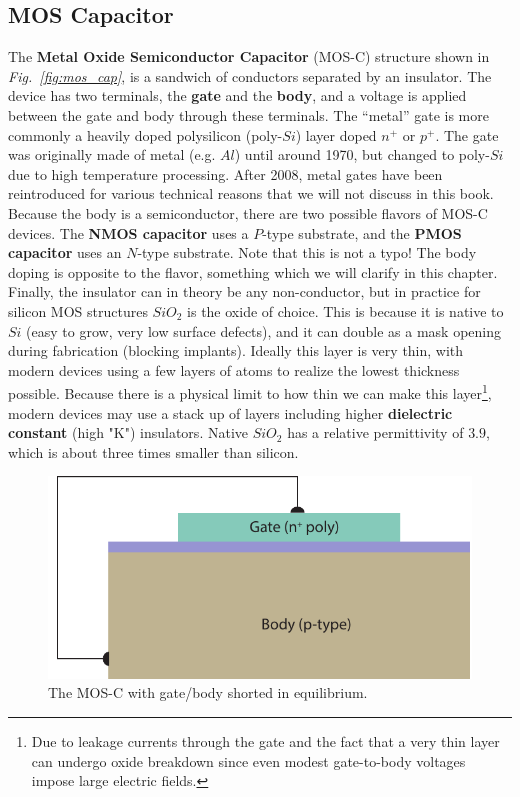 \subsection{MOS Capacitor}
The \textbf{Metal Oxide Semiconductor Capacitor} (MOS-C) structure shown in \emph{Fig.~\ref{fig:mos_cap}}, is a sandwich of conductors separated by an insulator.  The device has two terminals, the \textbf{gate} and the \textbf{body}, and a voltage is applied between the gate and body through these terminals.  The  “metal” gate is more commonly a heavily doped polysilicon (poly-$Si$) layer doped $n^+$ or $p^+$.  The gate was originally made of metal (e.g. $Al$) until around 1970, but changed to poly-$Si$ due to high temperature processing.  After 2008, metal gates have been reintroduced for various technical reasons that we will not discuss in this book.  Because the body is a semiconductor, there are two possible flavors of MOS-C devices.  The \textbf{NMOS capacitor} uses a $P$-type substrate, and the \textbf{PMOS capacitor} uses an $N$-type substrate.  Note that this is not a typo!  The body doping is opposite to the flavor, something which we will clarify in this chapter.  Finally, the insulator can in theory be any non-conductor, but in practice for silicon MOS structures $SiO_2$ is the oxide of choice.  This is because it is native to $Si$ (easy to grow, very low surface defects), and it can double as a mask opening during fabrication (blocking implants).  Ideally this layer is very thin, with modern devices using a few layers of atoms to realize the lowest thickness possible.  Because there is a physical limit to how thin we can make this layer\footnote{Due to leakage currents through the gate and the fact that a very thin layer can undergo oxide breakdown since even modest gate-to-body voltages impose large electric fields.}, modern devices may use a stack up of layers including higher \textbf{dielectric constant} (high "K") insulators.  Native $SiO_2$ has a relative permittivity of $3.9$, which is about three times smaller than silicon.
\begin{figure}[t]
\centering
\includegraphics[width=\columnwidth]{mos_cap_wire_short}
\caption{The MOS-C with gate/body shorted in equilibrium. }
\label{fig:mos_cap_gate_body_short}
\end{figure}
